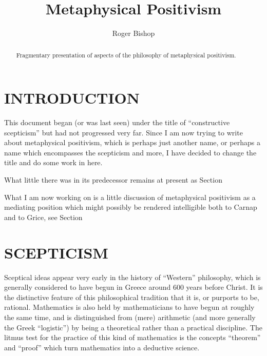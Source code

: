 \documentclass{rbjk}
\begin{document}
                                                                                   
\begin{article}
\begin{opening}  
\title{Metaphysical Positivism}
\author{Roger Bishop }

\begin{abstract}
Fragmentary presentation of aspects of the philosophy of metaphysical positivism.
\end{abstract}
\end{opening}

\setcounter{tocdepth}{4}
{\parskip-0pt\tableofcontents}

\section{INTRODUCTION}

This document began (or was last seen) under the title of ``constructive scepticism'' but had not progressed very far.
Since I am now trying to write about metaphysical positivism, which is perhaps just another name, or perhaps a name which encompasses the scepticism and more, I have decided to change the title and do some work in here.
 
What little there was in its predecessor remains at present as Section %

What I am now working on is a little discussion of metaphysical positivism as a mediating position which might possibly be rendered intelligible both to Carnap and to Grice, see Section %

\section{SCEPTICISM}\label{SCEPTICISM}

Sceptical ideas appear very early in the history of ``Western'' philosophy, which is generally considered to have begun in Greece around 600 years before Christ.
It is the distinctive feature of this philosophical tradition that it is, or purports to be, rational.
Mathematics is also held by mathematicians to have begun at roughly the same time, and is distinguished from (mere) arithmetic (and more generally the Greek ``logistic'') by being a theoretical rather than a practical discipline.
The litmus test for the practice of this kind of mathematics is the concepts ``theorem'' and ``proof'' which turn mathematics into a deductive science.


\end{article}
\end{document}
